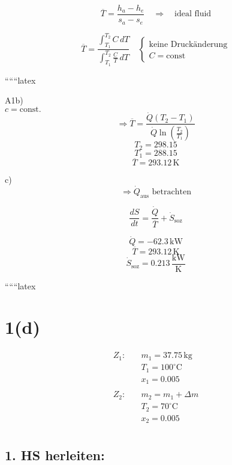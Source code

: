 \[
\overline{T} = \frac{h_a - h_e}{s_a - s_e} \quad \Rightarrow \quad \text{ideal fluid}
\]

\[
\overline{T} = \frac{\int_{T_1}^{T_2} C \, dT}{\int_{T_1}^{T_2} \frac{C}{T} \, dT} \quad \left\{ \begin{array}{l} \text{keine Druckänderung} \\ C = \text{const} \end{array} \right.
\]

``````latex

A1b) \\
$c = \text{const.}$ \\
\[
\Rightarrow \overline{T} = \frac{\dot{Q}(T_2 - T_1)}{\dot{Q} \ln \left( \frac{T_2}{T_1} \right)}
\]
\[
T_2 = 298.15
\]
\[
T_1 = 288.15
\]
\[
\overline{T} = 293.12 \, \text{K}
\]

c) \\
\[
\Rightarrow \dot{Q}_{\text{aus}} \text{ betrachten}
\]


\[
\frac{dS}{dt} = \frac{\dot{Q}}{\overline{T}} + \dot{S}_{\text{soz}}
\]

\[
\dot{Q} = -62.3 \, \text{kW}
\]
\[
\overline{T} = 293.12 \, \text{K}
\]
\[
\dot{S}_{\text{soz}} = 0.213 \, \frac{\text{kW}}{\text{K}}
\]

``````latex


\section*{1(d)}

\begin{align*}
Z_1: & \quad m_1 = 37.75 \, \text{kg} \\
     & \quad T_1 = 100^\circ \text{C} \\
     & \quad x_1 = 0.005 \\
\\
Z_2: & \quad m_2 = m_1 + \Delta m \\
     & \quad T_2 = 70^\circ \text{C} \\
     & \quad x_2 = 0.005 \\
\end{align*}

\subsection*{1. HS herleiten:}

